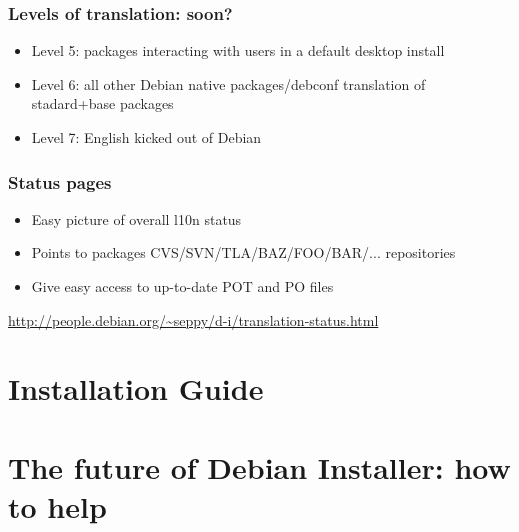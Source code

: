 \documentclass{beamer}
\begin{document}
\begin{frame}
  \frametitle{Levels of translation: soon?}
	\begin{itemize}
	\item
		Level 5: packages interacting with users in a default desktop install
	\item
		Level 6: all other Debian native packages/debconf translation of stadard+base packages
	\item
		Level 7: English kicked out of Debian
	\end{itemize}
\end{frame}

\begin{frame}
  \frametitle{Status pages}
	\begin{itemize}
	\item
		Easy picture of overall l10n status 
	\item
		Points to packages CVS/SVN/TLA/BAZ/FOO/BAR/... repositories
	\item
		Give easy access to up-to-date POT and PO files
	\end{itemize}

\url{http://people.debian.org/~seppy/d-i/translation-status.html}

\end{frame}


\section{Installation Guide}

\begin{frame}
  \frametitle{}
\end{frame}


\section{The future of Debian Installer: how to help}

\begin{frame}
  \frametitle{}
\end{frame}
\end{document}
